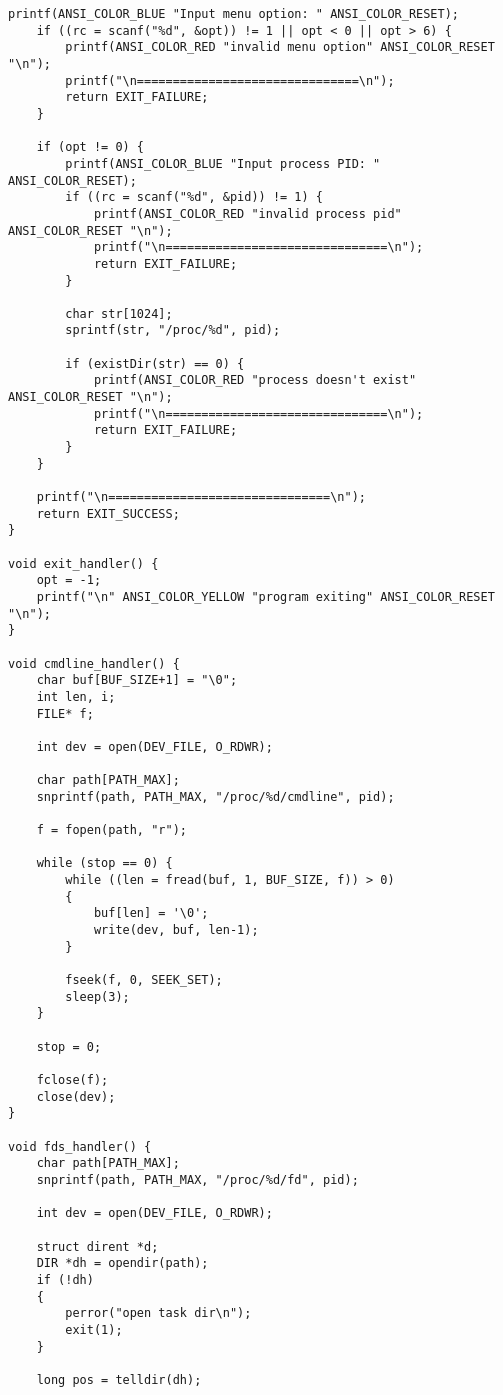 \begin{appendices}
\begin{lstlisting}[label=client,caption=Код разработанного приложения уровня пользователя]
    printf(ANSI_COLOR_BLUE "Input menu option: " ANSI_COLOR_RESET);
    if ((rc = scanf("%d", &opt)) != 1 || opt < 0 || opt > 6) {
        printf(ANSI_COLOR_RED "invalid menu option" ANSI_COLOR_RESET "\n");
        printf("\n===============================\n");
        return EXIT_FAILURE;
    }

    if (opt != 0) {
        printf(ANSI_COLOR_BLUE "Input process PID: " ANSI_COLOR_RESET);
        if ((rc = scanf("%d", &pid)) != 1) {
            printf(ANSI_COLOR_RED "invalid process pid" ANSI_COLOR_RESET "\n");
            printf("\n===============================\n");
            return EXIT_FAILURE;
        }

        char str[1024];
        sprintf(str, "/proc/%d", pid);

        if (existDir(str) == 0) {
            printf(ANSI_COLOR_RED "process doesn't exist" ANSI_COLOR_RESET "\n");
            printf("\n===============================\n");
            return EXIT_FAILURE;
        }
    }

    printf("\n===============================\n");
    return EXIT_SUCCESS;
}

void exit_handler() {
    opt = -1;
    printf("\n" ANSI_COLOR_YELLOW "program exiting" ANSI_COLOR_RESET "\n");
}

void cmdline_handler() {
    char buf[BUF_SIZE+1] = "\0";
    int len, i;
    FILE* f;

    int dev = open(DEV_FILE, O_RDWR);

    char path[PATH_MAX];
    snprintf(path, PATH_MAX, "/proc/%d/cmdline", pid);

    f = fopen(path, "r");

    while (stop == 0) {
        while ((len = fread(buf, 1, BUF_SIZE, f)) > 0)
        {
            buf[len] = '\0';
            write(dev, buf, len-1);
        }

        fseek(f, 0, SEEK_SET);
        sleep(3);
    }

    stop = 0;

    fclose(f);
    close(dev);
}

void fds_handler() {
    char path[PATH_MAX];
    snprintf(path, PATH_MAX, "/proc/%d/fd", pid);

    int dev = open(DEV_FILE, O_RDWR);

    struct dirent *d;
    DIR *dh = opendir(path);
    if (!dh)
    {
        perror("open task dir\n");
        exit(1);
    }

    long pos = telldir(dh);


\end{lstlisting}
\end{appendices}
